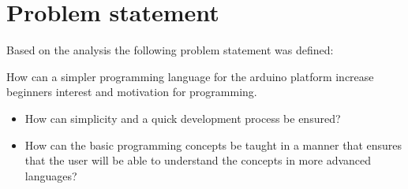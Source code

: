 \section{Problem statement}
Based on the analysis the following problem statement was defined:
\begin{center}
	How can a simpler programming language for the arduino platform increase beginners interest and motivation for programming.
\end{center}
\begin{itemize}
	\item How can simplicity and a quick development process be ensured?
	\item How can the basic programming concepts be taught in a manner that ensures that the user will be able to understand the concepts in more advanced languages?
\end{itemize}

 